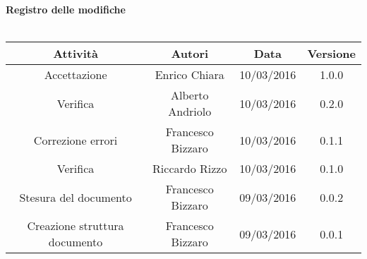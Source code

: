 \vspace{1cm}
   {\fontsize{15pt}{16pt}\selectfont \textbf{Registro delle modifiche}}\\ \\

\bgroup
\def\arraystretch{1.6}
\begin{tabular}{| c | c | c | c |}
\hline
\textbf{Attività} & \textbf{Autori} & \textbf{Data} & \textbf{Versione}\\ \hline \hline


Accettazione & Enrico Chiara & 10/03/2016 & 1.0.0 \\ \hline  

Verifica & Alberto Andriolo & 10/03/2016 & 0.2.0 \\ \hline

Correzione errori & Francesco Bizzaro & 10/03/2016 & 0.1.1 \\ \hline

Verifica & Riccardo Rizzo & 10/03/2016 & 0.1.0 \\ \hline

Stesura del documento & Francesco Bizzaro & 09/03/2016 & 0.0.2 \\ \hline

Creazione struttura documento & Francesco Bizzaro & 09/03/2016 & 0.0.1 \\ \hline


\end{tabular}
\egroup
\newpage